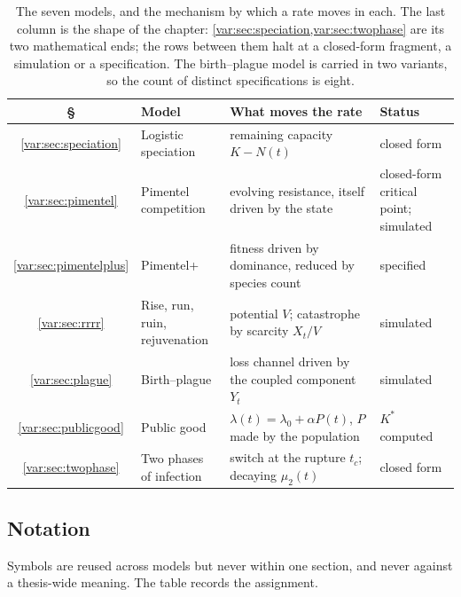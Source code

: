 \begin{table}[H]
\centering
\small
\begin{tabular}{@{}c>{\raggedright\arraybackslash}p{}>{\raggedright\arraybackslash}p{}>{\raggedright\arraybackslash}p{}@{}}
\toprule
\S & Model & What moves the rate & Status \\
\midrule
\ref{var:sec:speciation} & Logistic speciation
  & remaining capacity $K-N(t)$ & closed form \\
\ref{var:sec:pimentel} & Pimentel competition
  & evolving resistance, itself driven by the state
  & closed-form critical point; simulated \\
\ref{var:sec:pimentelplus} & Pimentel+
  & fitness driven by dominance, reduced by species count & specified \\
\ref{var:sec:rrrr} & Rise, run, ruin, rejuvenation
  & potential $V$; catastrophe by scarcity $X_t/V$ & simulated \\
\ref{var:sec:plague} & Birth--plague
  & loss channel driven by the coupled component $Y_t$ & simulated \\
\ref{var:sec:publicgood} & Public good
  & $\lambda(t)=\lambda_0+\alpha P(t)$, $P$ made by the population
  & $K^\ast$ computed \\
\ref{var:sec:twophase} & Two phases of infection
  & switch at the rupture $t_c$; decaying $\mu_2(t)$ & closed form \\
\bottomrule
\end{tabular}
\caption{The seven models, and the mechanism by which a rate moves in each.
The last column is the shape of the chapter:
\cref{var:sec:speciation,var:sec:twophase} are its two mathematical ends; the
rows between them halt at a closed-form fragment, a simulation or a
specification. The birth--plague model is carried in two variants, so the
count of distinct specifications is eight.}
\label{var:tab:models}
\end{table}

\subsection{Notation}
\label{var:sec:notation}

Symbols are reused across models but never within one section, and never
against a thesis-wide meaning. The table records the assignment.

